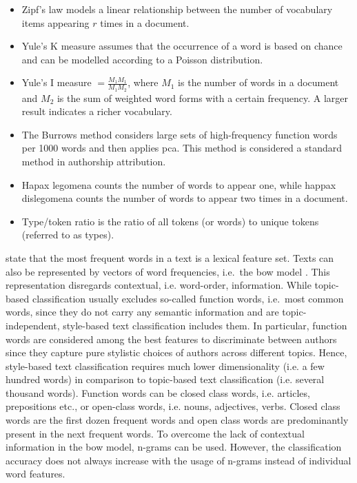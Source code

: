 \begin{itemize}
    \item Zipf's law models a linear relationship between the number of vocabulary items appearing $r$ times in a document.
    \item Yule's K measure assumes that the occurrence of a word is based on chance and can be modelled according to a Poisson distribution.
    \item Yule's I measure $= \frac{M_1 M_1}{M_1 M_2}$, where $M_1$ is the number of words in a document and $M_2$ is the sum of weighted word forms with a certain frequency. A larger result indicates a richer vocabulary.
    \item The Burrows method considers large sets of high-frequency function words per 1000 words and then applies \ac{pca}. This method is considered a standard method in authorship attribution.
    \item Hapax legomena counts the number of words to appear one, while happax dislegomena counts the number of words to appear two times in a document.
    \item Type/token ratio is the ratio of all tokens (or words) to unique tokens (referred to as types).
\end{itemize}
\citet{elmanarelbouanani_authorship_2014} state that the most frequent words in a text is a lexical feature set.
Texts can also be represented by vectors of word frequencies, i.e.\ the \ac{bow} model \citep{bevendorff_overview_2024}.
This representation disregards contextual, i.e. word-order, information.
While topic-based classification usually excludes so-called function words, 
i.e.\ most common words, since they do not carry any semantic information and are topic-independent, 
style-based text classification includes them.
In particular, function words are considered among the best features to discriminate between authors 
since they capture pure stylistic choices of authors across different topics.
Hence, style-based text classification requires much lower dimensionality (i.e. a few hundred words) 
in comparison to topic-based text classification (i.e. several thousand words).
Function words can be closed class words, i.e. articles, prepositions etc., 
or open-class words, i.e. nouns, adjectives, verbs.
Closed class words are the first dozen frequent words and 
open class words are predominantly present in the next frequent words.
To overcome the lack of contextual information in the \ac{bow} model, 
n-grams can be used.
However, the classification accuracy does not always increase with the usage of n-grams instead of individual word features.
